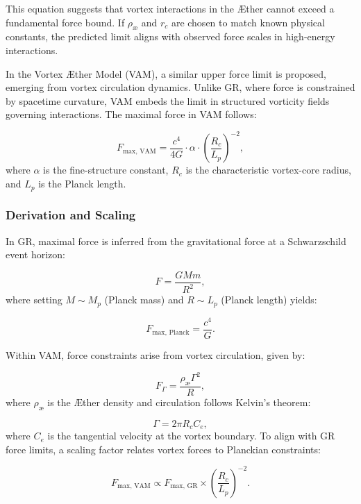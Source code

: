 \documentclass[a4paper,12pt]{article}
\begin{document}
This equation suggests that vortex interactions in the Æther cannot exceed a fundamental force bound. If \( \rho_{\text{\ae}} \) and \( r_c \) are chosen to match known physical constants, the predicted limit aligns with observed force scales in high-energy interactions.

In the Vortex Æther Model (VAM), a similar upper force limit is proposed, emerging from vortex circulation dynamics. Unlike GR, where force is constrained by spacetime curvature, VAM embeds the limit in structured vorticity fields governing interactions. The maximal force in VAM follows:


\begin{equation*}
    F_\text{max, VAM} = \frac{c^4}{4G} \cdot \alpha \cdot \left(\frac{R_c}{L_p}\right)^{-2},
\end{equation*}
where $\alpha$ is the fine-structure constant, $R_c$ is the characteristic vortex-core radius, and $L_p$ is the Planck length.


\subsubsection*{Derivation and Scaling}
In GR, maximal force is inferred from the gravitational force at a Schwarzschild event horizon:


\begin{equation*}
    F = \frac{GMm}{R^2},
\end{equation*}
where setting $M \sim M_p$ (Planck mass) and $R \sim L_p$ (Planck length) yields:


\begin{equation*}
    F_\text{max, Planck} = \frac{c^4}{G}.
\end{equation*}


Within VAM, force constraints arise from vortex circulation, given by:


\begin{equation*}
    F_{\Gamma} = \frac{\rho_\text{\ae} \Gamma^2}{R},
\end{equation*}
where $\rho_\text{\ae}$ is the Æther density and circulation follows Kelvin's theorem:


\begin{equation*}
    \Gamma = 2\pi R_c C_e,
\end{equation*}
where $C_e$ is the tangential velocity at the vortex boundary. To align with GR force limits, a scaling factor relates vortex forces to Planckian constraints:


\begin{equation*}
    F_\text{max, VAM} \propto F_\text{max, GR} \times \left(\frac{R_c}{L_p}\right)^{-2}.
\end{equation*}
\end{document}
